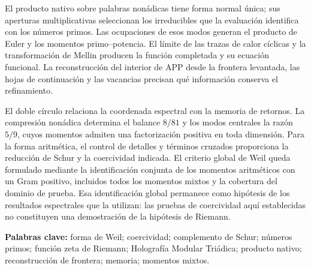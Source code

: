 El producto nativo sobre palabras nonádicas tiene forma normal
única; sus aperturas multiplicativas seleccionan los irreducibles
que la evaluación identifica con los números primos. Las
ocupaciones de esos modos generan el producto de Euler y los
momentos primo--potencia. El límite de las trazas de calor cíclicas
y la transformación de Mellin producen la función completada y
su ecuación funcional. La reconstrucción del interior de APP desde
la frontera levantada, las hojas de continuación y las vacancias
precisan qué información conserva el refinamiento.

El doble círculo relaciona la coordenada espectral con la memoria
de retornos. La compresión nonádica determina el balance $8/81$ y
los modos centrales la razón $5/9$, cuyos momentos admiten una
factorización positiva en toda dimensión. Para la forma aritmética,
el control de detalles y términos cruzados proporciona la reducción
de Schur y la coercividad indicada. El criterio global de Weil
queda formulado mediante la identificación conjunta de los momentos
aritméticos con un Gram positivo, incluidos todos los momentos
mixtos y la cobertura del dominio de prueba. Esa identificación
global permanece como hipótesis de los resultados espectrales que
la utilizan: las pruebas de coercividad aquí establecidas no
constituyen una demostración de la hipótesis de Riemann.

\medskip
\noindent\textbf{Palabras clave:} forma de Weil; coercividad;
complemento de Schur; números primos; función zeta de Riemann;
Holografía Modular Triádica; producto nativo; reconstrucción de
frontera; memoria; momentos mixtos.
\par\endgroup
